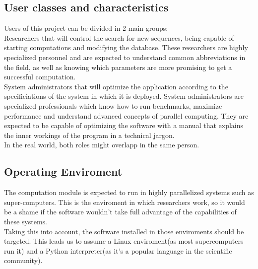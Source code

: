   \subsection{User classes and characteristics}

  Users of this project can be divided in 2 main groups:\\

  Researchers that will control the search for new sequences, being capable of
  starting computations and modifying the database. These researchers are highly
  specialized personnel and are expected to understand common abbreviations in
  the field, as well as knowing which parameters are more promising to get a
  successful computation.\\

  System administrators that will optimize the application according to the
  specificiations of the system in which it is deployed. System administrators
  are specialized professionals which know how to run benchmarks, maximize
  performance and understand advanced concepts of parallel computing. They are
  expected to be capable of optimizing the software with a manual that explains
  the inner workings of the program in a technical jargon.\\

  In the real world, both roles might overlapp in the same person.\\

  \subsection{Operating Enviroment}

  The computation module is expected to run in highly parallelized systems such
  as super-computers. This is the enviroment in which researchers work, so it
  would be a shame if the software wouldn't take full advantage of
  the capabilities of these systems.\\

  Taking this into account, the software installed in those enviroments should be
  targeted. This leads us to assume a Linux enviroment(as most supercomputers
  run it) and a Python interpreter(as it's a popular language in the scientific
  community).\\
